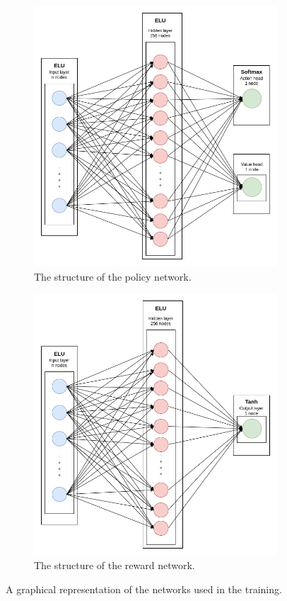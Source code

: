 \begin{figure}
    	\begin{subfigure}[b]{.5\textwidth}
    	\centering
    	\includegraphics[width=.9\linewidth]{figures/policy_network.png}
    	\caption{The structure of the policy network.}
    	\label{fig:policy-network}
    \end{subfigure}%
    \begin{subfigure}[b]{.5\textwidth}
    	\centering
    	\includegraphics[width=.9\linewidth]{figures/reward_network.png}
    	\caption{The structure of the reward network.}
    	\label{fig:reward-network}
    \end{subfigure}%
\caption{A graphical representation of the networks used in the training.}
\end{figure}


